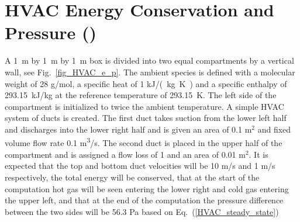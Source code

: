 \documentclass[11pt]{book}
\begin{document}
\section{HVAC Energy Conservation and Pressure (\texorpdfstring{}{HVAC\_energy\_pressure})}
\label{HVAC_energy_pressure}

A 1~m by 1~m by 1~m box is divided into two equal compartments by a vertical wall, see Fig.~\ref{fig_HVAC_e_p}.
The ambient species is defined with a molecular weight of 28 g/mol, a specific heat of 1 \si{kJ/(kg.K)} and a specific enthalpy of 293.15~kJ/kg at the reference temperature of 293.15~K.
The left side of the compartment is initialized to twice the ambient temperature.  A simple HVAC system of ducts is created.
The first duct takes suction from the lower left half and discharges into the lower right half and is given an area of 0.1 m$^2$ and fixed volume flow rate 0.1 \si{m^3/s}.
The second duct is placed in the upper half of the compartment and is assigned a flow loss of 1 and an area of 0.01 m$^2$.  It is expected that the top and bottom duct velocities will be 10 m/s and 1 m/s respectively, the total energy will be conserved, that at the start of the computation hot gas will be seen entering the lower right and cold gas entering the upper left, and that at the end of the computation the pressure difference between the two sides will be 56.3 Pa based on Eq.~(\ref{HVAC_steady_state})
\end{document}
